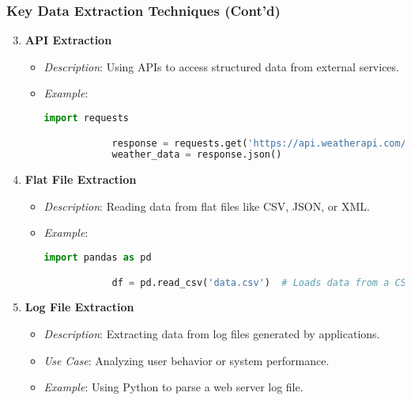 \documentclass[aspectratio=169]{beamer}
\begin{document}
\begin{frame}
    \frametitle{Key Data Extraction Techniques (Cont'd)}
    \begin{enumerate} \setcounter{enumi}{2}
        \item \textbf{API Extraction}
        \begin{itemize}
            \item \textit{Description}: Using APIs to access structured data from external services.
            \item \textit{Example}:
            \begin{lstlisting}[language=Python]
            import requests

            response = requests.get('https://api.weatherapi.com/v1/current.json?key=YOUR_API_KEY&q=London')
            weather_data = response.json()
            \end{lstlisting}
        \end{itemize}
        
        \item \textbf{Flat File Extraction} 
        \begin{itemize}
            \item \textit{Description}: Reading data from flat files like CSV, JSON, or XML.
            \item \textit{Example}:
            \begin{lstlisting}[language=Python]
            import pandas as pd

            df = pd.read_csv('data.csv')  # Loads data from a CSV file into a DataFrame.
            \end{lstlisting}
        \end{itemize}
        
        \item \textbf{Log File Extraction}
        \begin{itemize}
            \item \textit{Description}: Extracting data from log files generated by applications.
            \item \textit{Use Case}: Analyzing user behavior or system performance.
            \item \textit{Example}: Using Python to parse a web server log file.
        \end{itemize}

    \end{enumerate}
\end{frame}
\end{document}
